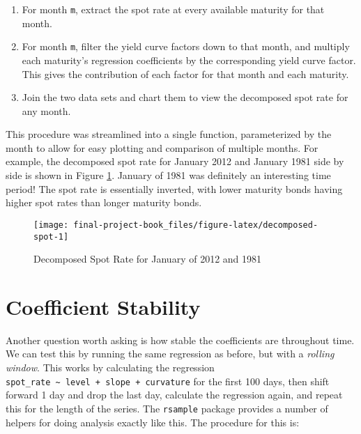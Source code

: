 \documentclass[openany]{book}
\providecommand{\tightlist}{%
  \setlength{\itemsep}{0pt}\setlength{\parskip}{0pt}}
\theoremstyle{definition}
\theoremstyle{definition}
\theoremstyle{definition}
\theoremstyle{remark}
\begin{document}
\begin{enumerate}
\def\labelenumi{\arabic{enumi})}
\tightlist
\item
  For month \texttt{m}, extract the spot rate at every available
  maturity for that month.
\item
  For month \texttt{m}, filter the yield curve factors down to that
  month, and multiply each maturity's regression coefficients by the
  corresponding yield curve factor. This gives the contribution of each
  factor for that month and each maturity.
\item
  Join the two data sets and chart them to view the decomposed spot rate
  for any month.
\end{enumerate}

\small

\normalsize

\small

\normalsize

\small

\normalsize

\small

\normalsize

This procedure was streamlined into a single function, parameterized by
the month to allow for easy plotting and comparison of multiple months.
For example, the decomposed spot rate for January 2012 and January 1981
side by side is shown in Figure \ref{fig:decomposed-spot}. January of
1981 was definitely an interesting time period! The spot rate is
essentially inverted, with lower maturity bonds having higher spot rates
than longer maturity bonds.

\small

\begin{figure}[H]

{\centering \texttt{[image: final-project-book\_files/figure-latex/decomposed-spot-1]} 

}

\caption{Decomposed Spot Rate for January of 2012 and 1981}\label{fig:decomposed-spot}
\end{figure}

\normalsize

\hypertarget{coef-stability}{%
\section{Coefficient Stability}\label{coef-stability}}

Another question worth asking is how stable the coefficients are
throughout time. We can test this by running the same regression as
before, but with a \emph{rolling window}. This works by calculating the
regression
\texttt{spot\_rate\ \textasciitilde{}\ level\ +\ slope\ +\ curvature}
for the first 100 days, then shift forward 1 day and drop the last day,
calculate the regression again, and repeat this for the length of the
series. The \texttt{rsample} package provides a number of helpers for
doing analysis exactly like this. The procedure for this is:
\end{document}
